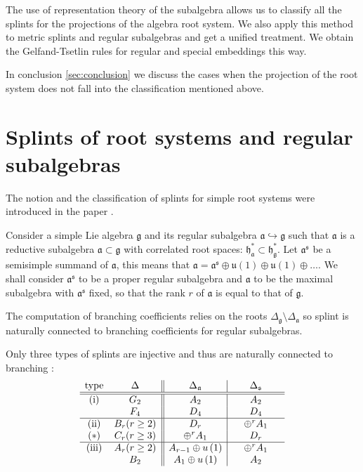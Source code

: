 \documentclass[12pt]{iopart}
\newcommand{\gf}{\mathfrak{g}}
\newcommand{\af}{\mathfrak{a}}
\newcommand{\sfr}{\mathfrak{s}}
\begin{document}
The use of representation theory of the subalgebra allows us to classify all the splints for the projections
of the algebra root system. We also apply this method to metric splints and regular subalgebras and get
a unified treatment. We obtain the Gelfand-Tsetlin rules for regular and special embeddings this way.

In conclusion \ref{sec:conclusion} we discuss the cases when the projection of the root system does
not fall into the classification mentioned above.

\section{Splints of root systems and regular subalgebras}
\label{sec:splints-root-systems}
The notion and the classification of
splints for simple root systems were introduced in the paper \cite{richter2008splints}.

Consider a simple Lie algebra $\mathfrak{g}$ and its regular subalgebra $%
\mathfrak{a}\hookrightarrow \mathfrak{g}$ such that $\mathfrak{a}$
is a
reductive subalgebra $\mathfrak{a \subset g}$ with correlated root spaces: $%
\mathfrak{h}_{\mathfrak{a}}^{\ast }\subset \mathfrak{h}_{\mathfrak{g }%
}^{\ast }$. Let $\mathfrak{a}^{\mathfrak{s}}$ be a semisimple summand of
$\mathfrak{a}$,
this means that $\mathfrak{a}=\mathfrak{a}^{\mathfrak{s}} \oplus \mathfrak{u}(1)\oplus %
\mathfrak{u}(1)\oplus \dots$. We shall consider $\mathfrak{a}^{\mathfrak{s}}$
to be a proper regular subalgebra and $\mathfrak{a}$ to be the
maximal subalgebra with $\mathfrak{a}^{\mathfrak{s}}$ fixed, so that the rank
$r$ of $\af$ is equal to that of $\mathfrak{g}$.

The computation of branching coefficients relies on the roots $\Delta_{\gf}\setminus \Delta_{\af}$
\cite{2010arXiv1007.0318L} so splint  is naturally connected to branching coefficients for regular
subalgebras.


Only three types of splints are
injective and thus are naturally connected to branching \cite{richter2008splints}:
\begin{equation}
\label{tab:1}
\begin{array}{cc||c|c}
\hbox{type} & \hspace{0.25in}\Delta \hspace{0.25in} & \hspace{0.25in}\Delta
_{\frak{a}}\hspace{0.25in} & \hspace{0.25in}\Delta _{\sfr}\hspace{0.25in}
\\ \hline\hline
\hbox{(i)} & G_{2} & A_{2} & A_{2} \\
& F_{4} & D_{4} & D_{4} \\ \hline
\hbox{(ii)} & B_{r}(r\geq 2) & D_{r} & \oplus ^{r}A_{1} \\
(*)& C_{r}(r\geq 3) & \oplus ^{r}A_{1} &  D_{r} \\ \hline
\hbox{(iii)} & A_{r}(r\geq 2) & A_{r-1}\oplus u\left( 1\right)  & \oplus
^{r}A_{1} \\
& B_{2} & A_{1}\oplus u\left( 1\right)  & A_{2}
\end{array}
\end{equation}
\end{document}
